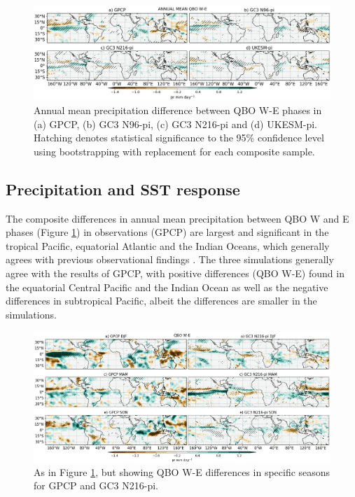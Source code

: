 \begin{figure}[t!]
\centering
 \includegraphics[width=\linewidth]{figures/piprclimqbowqboe.png}
\caption[Annual mean precipitation composite difference QBO W-E ]{ Annual mean precipitation difference between QBO W-E phases in (a) GPCP, (b) GC3 N96-pi, (c) GC3 N216-pi and (d) UKESM-pi. Hatching denotes statistical significance to the 95\% confidence level using bootstrapping with replacement for each composite sample. }
\label{fig:qboclim}
\end{figure}

\subsection{Precipitation and SST response}

The composite differences in annual mean precipitation between QBO W and E phases (Figure \ref{fig:qboclim}) in observations (GPCP) are largest and significant in the tropical Pacific, equatorial Atlantic and the Indian Oceans, which generally agrees with previous observational findings \citep{liess2012,gray2018}. The three simulations generally agree with the results of GPCP, with positive differences (QBO W-E) found in the equatorial Central Pacific and the Indian Ocean as well as the negative differences in subtropical Pacific, albeit the differences are smaller in the simulations. 

\begin{figure}[t!]
\centering
 \includegraphics[width=\linewidth]{figures/paperprqbowqboe.png}
\caption[DJF mean precipitation composite difference QBO W-E ]{ As in Figure \ref{fig:qboclim}, but showing QBO W-E differences in specific seasons for GPCP and GC3 N216-pi. }
\label{fig:qbodjf}
\end{figure}

